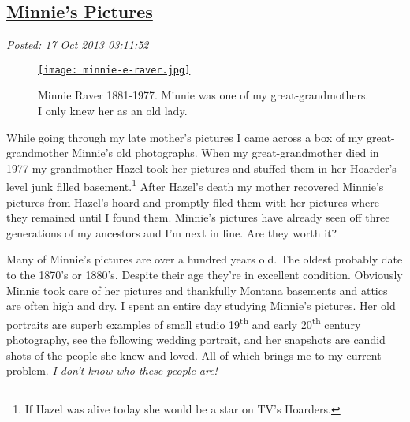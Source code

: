 %

\subsection*{\href{https://bakerjd99.wordpress.com/2013/10/16/minnies-pictures/}{Minnie's Pictures}}


\noindent\emph{Posted: 17 Oct 2013 03:11:52}
\vspace{6pt}




\captionsetup[figure]{labelformat=empty}
\begin{SCfigure}[1.5][!h]
\centering
\href{http://conceptcontrol.smugmug.com/People/Minnie-Raver/i-k6pnSJ4/A}{\texttt{[image: minnie-e-raver.jpg]}}
\caption{Minnie Raver 1881-1977. Minnie was one of my great-grandmothers. I only knew her as an old
lady.}
\label{fig:4230X0}
\end{SCfigure}


While going through my late mother's pictures I came across a box of my
great-grandmother Minnie's old photographs. When my great-grandmother
died in 1977 my grandmother
\href{http://conceptcontrol.smugmug.com/People/Grandparents-1/i-PBjmr7p/A}{Hazel}
took her pictures and stuffed them in her
\href{http://www.aetv.com/hoarders/}{Hoarder's level} junk filled
basement.\footnote{
If Hazel was alive today she would be a star on TV's Hoarders.
} After Hazel's death
\href{http://conceptcontrol.smugmug.com/People/The-Way-We-Were/i-Z64DmrR/A}{my
mother} recovered Minnie's pictures from Hazel's hoard and promptly
filed them with her pictures where they remained until I found them.
Minnie's pictures have already seen off three generations of my
ancestors and I'm next in line. Are they worth it?

Many of Minnie's pictures are over a hundred years old. The oldest
probably date to the 1870's or 1880's. Despite their age they're in
excellent condition. Obviously Minnie took care of her pictures and
thankfully Montana basements and attics are often high and dry. I spent
an entire day studying Minnie's pictures. Her old portraits are superb
examples of small studio 19\textsuperscript{th} and early
20\textsuperscript{th} century photography, see the following
\href{https://familysearch.org/pal:/MM9.1.1/F3SR-Q8S}{wedding portrait},
and her snapshots are candid shots of the people she knew and loved. All
of which brings me to my current problem. \emph{I don't know who these
people are!}


